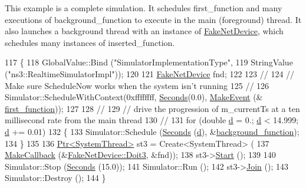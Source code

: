 This example is a complete simulation. It schedules {\ttfamily first\+\_\+function} and many executions of {\ttfamily background\+\_\+function} to execute in the main (foreground) thread. It also launches a background thread with an instance of \hyperlink{classFakeNetDevice}{Fake\+Net\+Device}, which schedules many instances of {\ttfamily inserted\+\_\+function}. 
\begin{DoxyCode}
117 \{
118   GlobalValue::Bind (\textcolor{stringliteral}{"SimulatorImplementationType"}, 
119                      StringValue (\textcolor{stringliteral}{"ns3::RealtimeSimulatorImpl"}));
120 
121   \hyperlink{classFakeNetDevice}{FakeNetDevice} fnd;
122 
123   \textcolor{comment}{// }
124   \textcolor{comment}{// Make sure ScheduleNow works when the system isn't running}
125   \textcolor{comment}{//}
126   Simulator::ScheduleWithContext(0xffffffff, \hyperlink{group__timecivil_ga33c34b816f8ff6628e33d5c8e9713b9e}{Seconds}(0.0), \hyperlink{group__makeeventfnptr_ga289a28a2497c18a9bd299e5e2014094b}{MakeEvent} (&
      \hyperlink{main-test-sync_8cc_aa009afa571d9f2b4edbeeb80fb22fca3}{first\_function}));
127 
128   \textcolor{comment}{// }
129   \textcolor{comment}{// drive the progression of m\_currentTs at a ten millisecond rate from the main thread}
130   \textcolor{comment}{//}
131   \textcolor{keywordflow}{for} (\textcolor{keywordtype}{double} \hyperlink{buildings__pathloss_8m_a9f9b934daed17a4d3613b6886ff4cf4b}{d} = 0.; \hyperlink{buildings__pathloss_8m_a9f9b934daed17a4d3613b6886ff4cf4b}{d} < 14.999; \hyperlink{buildings__pathloss_8m_a9f9b934daed17a4d3613b6886ff4cf4b}{d} += 0.01)
132     \{
133       Simulator::Schedule (\hyperlink{group__timecivil_ga33c34b816f8ff6628e33d5c8e9713b9e}{Seconds} (\hyperlink{buildings__pathloss_8m_a9f9b934daed17a4d3613b6886ff4cf4b}{d}), &\hyperlink{main-test-sync_8cc_afeb997847681305e1f5fd01776870464}{background\_function});
134     \}
135 
136   \hyperlink{classns3_1_1Ptr}{Ptr<SystemThread>} st3 = Create<SystemThread> (
137       \hyperlink{group__makecallbackmemptr_ga9376283685aa99d204048d6a4b7610a4}{MakeCallback} (&\hyperlink{classFakeNetDevice_a8a9e7c66558bdae03fac8940d3682849}{FakeNetDevice::Doit3}, &fnd));
138   st3->\hyperlink{classns3_1_1SystemThread_a95716a1cd24ee8e7c6a08b7a2ad9481e}{Start} ();
139 
140   Simulator::Stop (\hyperlink{group__timecivil_ga33c34b816f8ff6628e33d5c8e9713b9e}{Seconds} (15.0));
141   Simulator::Run ();
142   st3->\hyperlink{classns3_1_1SystemThread_a1cd5114bf675acf91565a6b85c95545f}{Join} ();
143   Simulator::Destroy ();
144 \}
\end{DoxyCode}


